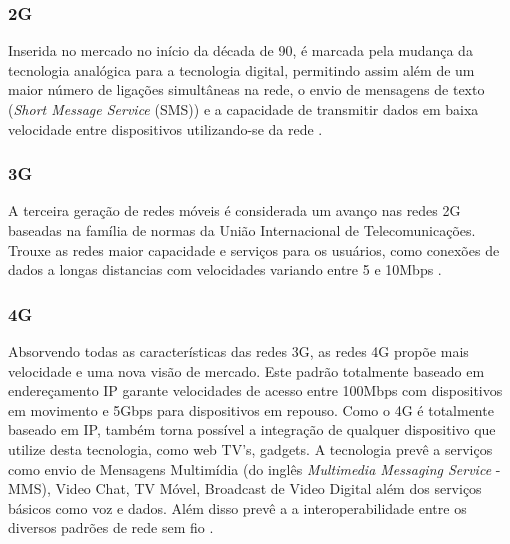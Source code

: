\subsubsection{2G}
Inserida no mercado no início da década de 90, é marcada pela mudança da tecnologia analógica para a tecnologia digital, permitindo assim além de um maior número de ligações simultâneas na rede, o envio de mensagens de texto (\emph{Short Message Service} (SMS)) e a capacidade de transmitir dados em baixa velocidade entre dispositivos utilizando-se da rede \cite{GeracoesTelefoniaMovel}.

\subsubsection{3G}
A terceira geração de redes móveis é considerada um avanço nas redes 2G baseadas na família de normas da União Internacional de Telecomunicações. Trouxe as redes maior capacidade e serviços para os usuários, como conexões de dados a longas distancias com velocidades variando entre 5 e 10Mbps \cite{GeracoesTelefoniaMovel}.

\subsubsection{4G}
Absorvendo todas as características das redes 3G, as redes 4G propõe mais velocidade e uma nova visão de mercado. Este padrão totalmente baseado em endereçamento IP garante velocidades de acesso entre 100Mbps com dispositivos em movimento e 5Gbps para dispositivos em repouso. Como o 4G é totalmente baseado em IP, também torna possível a integração de qualquer dispositivo que utilize desta tecnologia, como web TV's, gadgets. A tecnologia prevê a serviços como envio de Mensagens Multimídia (do inglês \emph{Multimedia Messaging Service} - MMS), Video Chat, TV Móvel, Broadcast de Video Digital além dos serviços básicos como voz e dados. Além disso prevê a a interoperabilidade entre os diversos padrões de rede sem fio \cite{GeracoesTelefoniaMovel}.
